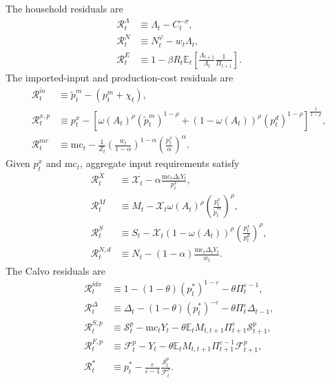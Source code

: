 ﻿\documentclass[12pt]{article}
\theoremstyle{remark}
\newcommand{\E}{\mathbb E}
\newcommand{\mc}{\mathrm{mc}}
\begin{document}
The household residuals are
\begin{align}
    \mathcal R_t^\Lambda
    &\equiv
    \Lambda_t-C_t^{-\sigma},
    \label{eq:app_deqn_R_lambda}\\
    \mathcal R_t^N
    &\equiv
    N_t^\varphi-w_t\Lambda_t,
    \label{eq:app_deqn_R_labor_supply}\\
    \mathcal R_t^E
    &\equiv
    1-\beta R_t
    \E_t
    \left[
        \frac{\Lambda_{t+1}}{\Lambda_t}
        \frac{1}{\Pi_{t+1}}
    \right].
    \label{eq:app_deqn_R_euler}
\end{align}
The imported-input and production-cost residuals are
\begin{align}
    \mathcal R_t^{\tilde m}
    &\equiv
    \tilde p_t^m-(p_t^m+\chi_t),
    \label{eq:app_deqn_R_effective_price}\\
    \mathcal R_t^{x,p}
    &\equiv
    p_t^x
    -
    \left[
        \omega(A_t)^\rho(\tilde p_t^m)^{1-\rho}
        +
        (1-\omega(A_t))^\rho(p_t^d)^{1-\rho}
    \right]^{\frac{1}{1-\rho}},
    \label{eq:app_deqn_R_px}\\
    \mathcal R_t^{mc}
    &\equiv
    \mc_t
    -
    \frac{1}{Z_t}
    \left(\frac{w_t}{1-\alpha}\right)^{1-\alpha}
    \left(\frac{p_t^x}{\alpha}\right)^\alpha .
    \label{eq:app_deqn_R_mc}
\end{align}
Given $p_t^x$ and $\mc_t$, aggregate input requirements satisfy
\begin{align}
    \mathcal R_t^{X}
    &\equiv
    \mathcal X_t
    -
    \alpha\frac{\mc_t\Delta_tY_t}{p_t^x},
    \label{eq:app_deqn_R_X}\\
    \mathcal R_t^{M}
    &\equiv
    M_t
    -
    \mathcal X_t
    \omega(A_t)^\rho
    \left(\frac{p_t^x}{\tilde p_t^m}\right)^\rho,
    \label{eq:app_deqn_R_M}\\
    \mathcal R_t^{S}
    &\equiv
    S_t
    -
    \mathcal X_t
    (1-\omega(A_t))^\rho
    \left(\frac{p_t^x}{p_t^d}\right)^\rho,
    \label{eq:app_deqn_R_S}\\
    \mathcal R_t^{N,d}
    &\equiv
    N_t
    -
    (1-\alpha)\frac{\mc_t\Delta_tY_t}{w_t}.
    \label{eq:app_deqn_R_N_demand}
\end{align}
The Calvo residuals are
\begin{align}
    \mathcal R_t^{idx}
    &\equiv
    1-(1-\theta)(p_t^*)^{1-\varepsilon}-\theta\Pi_t^{\varepsilon-1},
    \label{eq:app_deqn_R_calvo_index}\\
    \mathcal R_t^{\Delta}
    &\equiv
    \Delta_t-(1-\theta)(p_t^*)^{-\varepsilon}
    -\theta\Pi_t^\varepsilon\Delta_{t-1},
    \label{eq:app_deqn_R_delta}\\
    \mathcal R_t^{S,p}
    &\equiv
    \mathcal S_t^p-\mc_tY_t
    -
    \theta\E_tM_{t,t+1}\Pi_{t+1}^{\varepsilon}\mathcal S_{t+1}^p,
    \label{eq:app_deqn_R_Sp}\\
    \mathcal R_t^{F,p}
    &\equiv
    \mathcal F_t^p-Y_t
    -
    \theta\E_tM_{t,t+1}\Pi_{t+1}^{\varepsilon-1}\mathcal F_{t+1}^p,
    \label{eq:app_deqn_R_Fp}\\
    \mathcal R_t^{*}
    &\equiv
    p_t^*
    -
    \frac{\varepsilon}{\varepsilon-1}
    \frac{\mathcal S_t^p}{\mathcal F_t^p}.
    \label{eq:app_deqn_R_reset}
\end{align}
\end{document}
